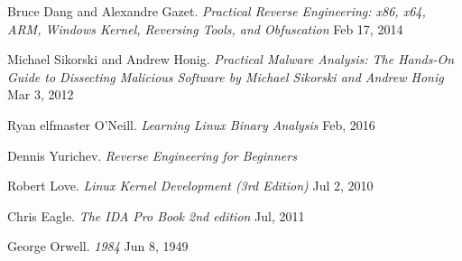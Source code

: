 \documentclass[12pt,oneside]{fithesis2}
\begin{document}
    \setlength{} 
    \renewcommand\bibname{Bibliografia}
    \begin{thebibliography}{10}
    Bruce Dang and Alexandre Gazet.
    \textit{Practical Reverse Engineering: x86, x64, ARM, Windows Kernel, Reversing Tools, and Obfuscation} Feb 17, 2014
 
    Michael Sikorski and Andrew Honig.
    \textit{Practical Malware Analysis: The Hands-On Guide to Dissecting Malicious Software by Michael Sikorski and Andrew Honig } Mar 3, 2012
    
    Ryan elfmaster O'Neill.
    \textit{ Learning Linux Binary Analysis } Feb, 2016

    Dennis Yurichev.
    \textit{ Reverse Engineering for Beginners }

    Robert Love.
    \textit{ Linux Kernel Development (3rd Edition) } Jul 2, 2010
    
    Chris Eagle.
    \textit{ The IDA Pro Book 2nd edition } Jul, 2011

    George Orwell.
    \textit{ 1984 } Jun 8, 1949
    
    \end{thebibliography}
\end{document}
